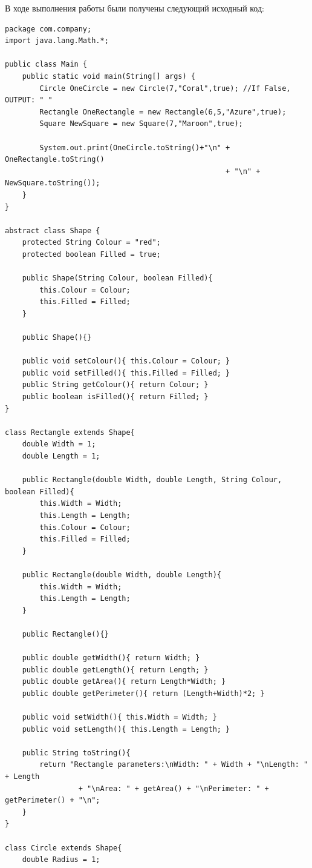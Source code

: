 \documentclass{article}
\begin{document}
В ходе выполнения работы были получены следующий исходный код:
\begin{verbatim}
package com.company;
import java.lang.Math.*;

public class Main {
    public static void main(String[] args) {
        Circle OneCircle = new Circle(7,"Coral",true); //If False, OUTPUT: " "
        Rectangle OneRectangle = new Rectangle(6,5,"Azure",true);
        Square NewSquare = new Square(7,"Maroon",true);

        System.out.print(OneCircle.toString()+"\n" + OneRectangle.toString() 
                                                   + "\n" + NewSquare.toString());
    }
}

abstract class Shape {
    protected String Colour = "red";
    protected boolean Filled = true;

    public Shape(String Colour, boolean Filled){
        this.Colour = Colour;
        this.Filled = Filled;
    }

    public Shape(){}

    public void setColour(){ this.Colour = Colour; }
    public void setFilled(){ this.Filled = Filled; }
    public String getColour(){ return Colour; }
    public boolean isFilled(){ return Filled; }
}

class Rectangle extends Shape{
    double Width = 1;
    double Length = 1;

    public Rectangle(double Width, double Length, String Colour, boolean Filled){
        this.Width = Width;
        this.Length = Length;
        this.Colour = Colour;
        this.Filled = Filled;
    }

    public Rectangle(double Width, double Length){
        this.Width = Width;
        this.Length = Length;
    }

    public Rectangle(){}

    public double getWidth(){ return Width; }
    public double getLength(){ return Length; }
    public double getArea(){ return Length*Width; }
    public double getPerimeter(){ return (Length+Width)*2; }

    public void setWidth(){ this.Width = Width; }
    public void setLength(){ this.Length = Length; }

    public String toString(){
        return "Rectangle parameters:\nWidth: " + Width + "\nLength: " + Length 
                 + "\nArea: " + getArea() + "\nPerimeter: " + getPerimeter() + "\n";
    }
}

class Circle extends Shape{
    double Radius = 1;


\end{verbatim}
\end{document}
